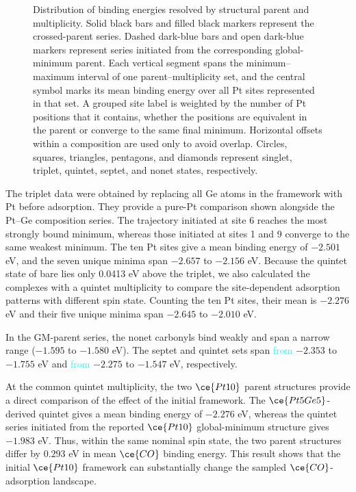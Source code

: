 \begin{figure}[H]
\centering

\caption{Distribution of  binding energies resolved by structural parent and
multiplicity. Solid black bars and filled black markers represent the
crossed-parent series. Dashed dark-blue bars and open dark-blue markers
represent series initiated from the corresponding global-minimum parent. Each
vertical segment spans the minimum--maximum
interval of one parent--multiplicity set, and the central symbol marks its
mean binding energy over all Pt sites represented in that set. A grouped site
label is weighted by the number of Pt positions that it contains, whether the
positions are equivalent in the parent or converge to the same final minimum.
Horizontal offsets within a composition are used only to avoid
overlap. Circles, squares, triangles, pentagons, and diamonds represent singlet,
triplet, quintet, septet, and nonet states, respectively.}
\label{fig:tfg_adsorption_distribution}
\end{figure}

{The triplet  data were obtained by replacing all Ge atoms in
the  framework with Pt before  adsorption.} They provide a
pure-Pt comparison shown alongside the
Pt--Ge composition series. The trajectory initiated at site 6 reaches the most strongly bound minimum,
whereas those initiated at sites 1 and 9 converge to the same weakest
minimum. The ten Pt sites give a mean binding energy of $-2.501$ eV, and the
seven unique minima span
$-2.657$ to $-2.156$ eV. Because the quintet state of bare  lies only 0.0413 eV
above the triplet, {we also calculated the complexes with a quintet multiplicity to compare
the site-dependent adsorption patterns with different spin state.}
Counting the ten Pt sites, their mean is
$-2.276$ eV and their five unique minima span $-2.645$ to $-2.010$ eV.

{In the GM-parent  series, the nonet carbonyls bind weakly and
span a narrow range ($-1.595$ to $-1.580$ eV). The septet and quintet sets
span \textcolor{cyan}{from} $-2.353$ to $-1.755$ eV and \textcolor{cyan}{from} $-2.275$ to $-1.547$ eV, respectively.}

At the common quintet multiplicity, the two \(\ce{Pt10}\) parent structures provide a direct comparison of the effect of the initial framework. The \(\ce{Pt5Ge5}\)-derived quintet gives a mean binding energy of \(-2.276\) eV, whereas the quintet series initiated from the reported \(\ce{Pt10}\) global-minimum structure gives \(-1.983\) eV. Thus, within the same nominal spin state, the two parent structures differ by \(0.293\) eV in mean \(\ce{CO}\) binding energy. This result shows that the initial \(\ce{Pt10}\) framework can substantially change the sampled \(\ce{CO}\)-adsorption landscape.


